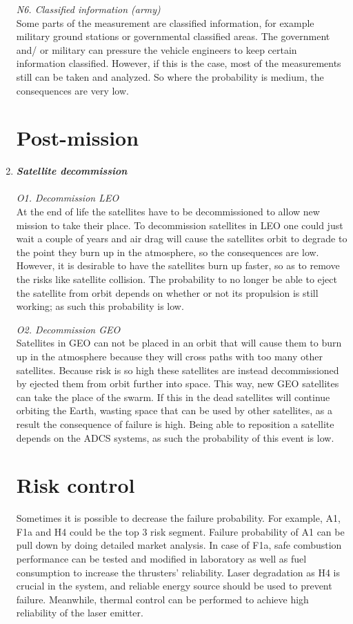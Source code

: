 \begin{enumerate}[A]
\textit{N6. Classified information (army)}\\ 
Some parts of the measurement are classified information, for example military ground stations or governmental classified areas. The government and/ or military can pressure the vehicle engineers to keep certain information classified. However, if this is the case, most of the measurements still can be taken and analyzed. So where the probability is medium, the consequences are very low.

\section{Post-mission}
\label{blTRAPm}
	\item\textbf{\textit{Satellite decommission}} \\\\
\textit{O1. Decommission LEO}\\ 
At the end of life the satellites have to be decommissioned to allow new mission to take their place. To decommission satellites in \ac{LEO} one could just wait a couple of years and air drag will cause the satellites orbit to degrade to the point they burn up in the atmosphere, so the consequences are low. However, it is desirable to have the satellites burn up faster, so as to remove the risks like satellite collision. The probability to no longer be able to eject the satellite from orbit depends on whether or not its propulsion is still working; as such this probability is low.

\textit{O2. Decommission GEO}\\ 
Satellites in GEO can not be placed in an orbit that will cause them to burn up in the atmosphere because they will cross paths with too many other satellites. Because risk is so high these satellites are instead decommissioned by ejected them from orbit further into space. This way, new GEO satellites can take the place of the swarm. If this in the dead satellites will continue orbiting the Earth, wasting space that can be used by other satellites, as a result the consequence of failure is high. Being able to reposition a satellite depends on the ADCS systems, as such the probability of this event is low.

\section{Risk control}
\label{blTRARC}
Sometimes it is possible to decrease the failure probability. For example, A1, F1a and H4 could be the top 3 risk segment. Failure probability of A1 can be pull down by doing detailed market analysis. In case of F1a, safe combustion performance can be tested and modified in laboratory as well as fuel consumption to increase the thrusters' reliability. Laser degradation as H4 is crucial in the system, and reliable energy source should be used to prevent failure. Meanwhile, thermal control can be performed to achieve high reliability of the laser emitter.  


\end{enumerate}
